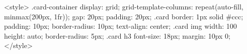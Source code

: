 <style>
.card-container {
    display: grid;
    grid-template-columns: repeat(auto-fill, minmax(200px, 1fr));
    gap: 20px;
    padding: 20px;
}
.card {
    border: 1px solid #ccc;
    padding: 10px;
    border-radius: 10px;
    text-align: center;
}
.card img {
    width: 100%
    height: auto;
    border-radius: 5px;
}
.card h3 {
    font-size: 18px;
    margin: 10px 0;
}
</style>